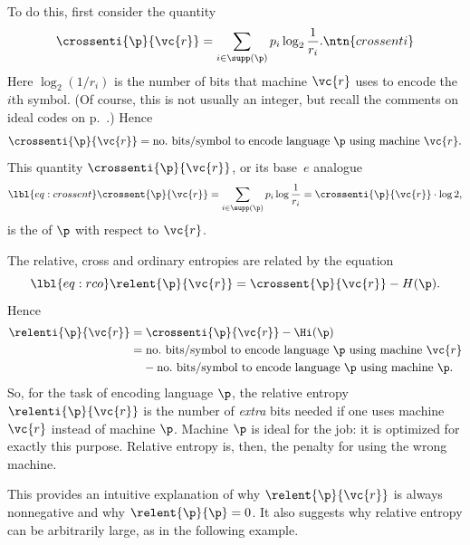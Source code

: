To do this, first consider the quantity
% 
\[
\crossenti{\p}{\vc{r}}
=
\sum_{i \in \supp(\p)} p_i \log_2 \frac{1}{r_i}.
\ntn{crossenti}
\]
% 
Here $\log_2(1/r_i)$ is the number of bits that machine $\vc{r}$ uses to
encode the $i$th symbol.  (Of course, this is not usually an integer, but
recall the comments on ideal codes on p.~\pageref{p:ideal}.)  Hence
\[
\crossenti{\p}{\vc{r}}
=
\text{no.\ bits/symbol to encode language } \p \text{ using machine } \vc{r}.
\]
This quantity $\crossenti{\p}{\vc{r}}$, or its base~$e$ analogue
% 
\begin{equation}
\lbl{eq:crossent}
\crossent{\p}{\vc{r}} 
= 
\sum_{i \in \supp(\p)} p_i \log \frac{1}{r_i}
=
\crossenti{\p}{\vc{r}}\cdot \log 2,
\end{equation}
% 
is the  of $\p$ with respect to $\vc{r}$.

The relative, cross and ordinary entropies are related by the equation
% 
\begin{equation}
\lbl{eq:rco}
\relent{\p}{\vc{r}} = \crossent{\p}{\vc{r}} - H(\p).
\end{equation}
% 
Hence
% 
\begin{align*}
\relenti{\p}{\vc{r}}    &
=
\crossenti{\p}{\vc{r}} - \Hi(\p)        
\\
&
=
\text{no.\ bits/symbol to encode language } \p \text{ using machine }
\vc{r}  
\\
&
\phantom{= \mbox{}}
{} - \text{no.\ bits/symbol to encode language } \p 
\text{ using machine } \p.
\end{align*}
% 
So, for the task of encoding language $\p$, the relative entropy
$\relenti{\p}{\vc{r}}$ is the number of \emph{extra} bits needed if one
uses machine $\vc{r}$ instead of machine $\p$.  Machine $\p$ is ideal for
the job: it is optimized for exactly this purpose.  Relative entropy is,
then, the penalty for using the wrong machine.

This provides an intuitive explanation of why $\relent{\p}{\vc{r}}$ is
always nonnegative and why $\relent{\p}{\p} = 0$.  It also suggests why
relative entropy can be arbitrarily large, as in the following example.

